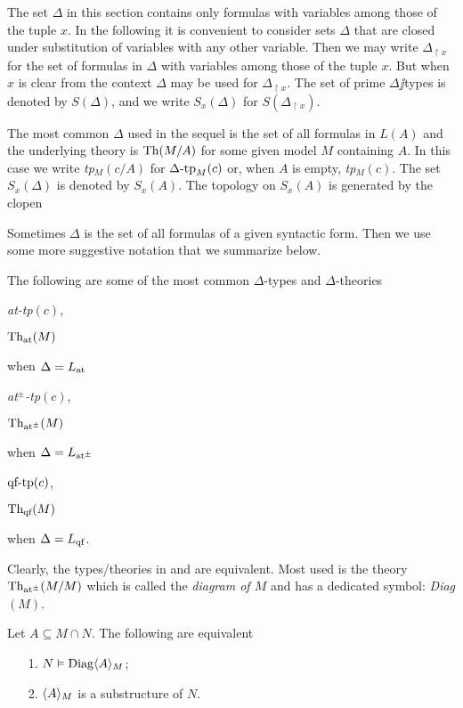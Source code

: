 \documentclass[creche.tex]{subfiles}
\begin{document}
The set $\Delta$ in this section contains only formulas with variables among those of the tuple $x$. In the following it is convenient to consider sets $\Delta$ that are closed under substitution of variables with any other variable. Then we may write \emph{$\Delta_{\restriction x}$} for the set of formulas in $\Delta$ with variables among those of the tuple $x$. But when $x$ is clear from the context $\Delta$ may be used for $\Delta_{\restriction x}$. The set of prime $\Delta\jj$types is denoted by \emph{$S(\Delta)$}, and we write \emph{$S_x(\Delta)$\/} for $S(\Delta_{\restriction x})$.

The most common $\Delta$ used in the sequel is the set of all formulas in $L(A)$ and the underlying theory is $\textrm{Th}(M/A)$ for some given model $M$ containing $A$. In this case we write \emph{tp$_M(c/A)$} for $\Delta\mbox{-}\textrm{tp}_M(c)$ or, when $A$ is empty, \emph{tp$_M(c)$}. The set $S_x(\Delta)$ is denoted by $S_x(A)$. The topology on  $S_x(A)$ is generated by the clopen


Sometimes $\Delta$ is the set of all formulas of a given syntactic form. Then we use some more suggestive notation that we summarize below.

\begin{notation}\label{note_tipi_diagramma}
The following are some of the most common $\Delta$-types and $\Delta$-theories
\def\ceq#1#2{\parbox[b]{15ex}{#1}\parbox[b]{14ex}{\hfill #2}}


\ceq{\hfill\emph{\textrm{at-tp}$(c)$},}{\emph{$\textrm{Th}_{\textrm{\scriptsize at}}(M)$\/}}\qquad when $\Delta=L_{\tiny\rm at}\hskip-.3ex$

\ceq{\hfill\emph{\textrm{at$^\pm$-tp}$(c)$},}{\emph{$\textrm{Th}_{\textrm{\scriptsize at}^\pm}(M)$\/}}\qquad when $\Delta=L_{{\tiny\rm at^\pm}}\hskip-.3ex$

\ceq{\hfill\emph{$\textrm{qf\mbox{-}tp}(c)$},}{\emph{$\textrm{Th}_{\textrm{\scriptsize qf}}(M)$\/}}\qquad when $\Delta=L_{\rm qf}$.

Clearly, the types/theories in  and  are equivalent. Most used is the theory $\textrm{Th}_{\textrm{\scriptsize at}^\pm}(M/M)$ which is called the \emph{diagram of $M$\/} and has a dedicated symbol: \emph{Diag$(M)$}.\QED
\end{notation}

\begin{remark}\label{rem_diagram}
Let $A\subseteq M\cap N$. The following are equivalent
\begin{itemize}
\item[1.] $N\vDash{\rm Diag}\langle A\rangle_M$;
\item[2.] $\langle A\rangle_M$ is a substructure of $N$.\QED
\end{itemize}
\end{remark}
\end{document}
